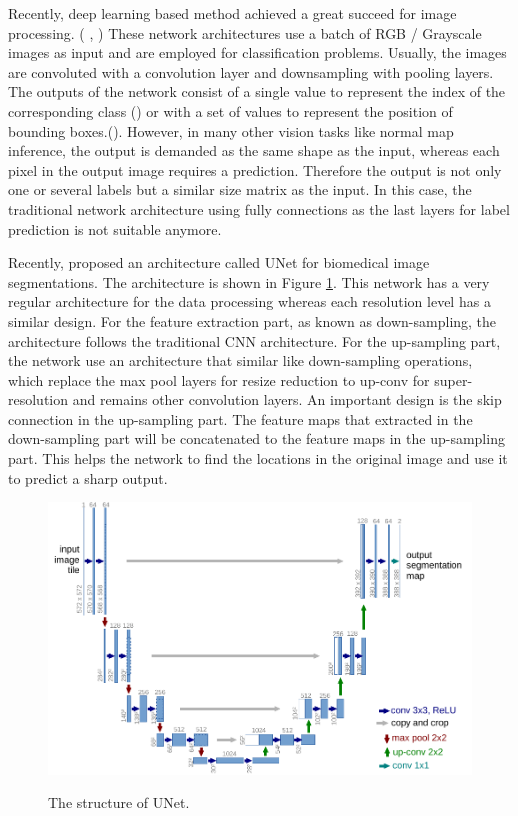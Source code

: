 Recently, deep learning based method achieved a great succeed for image processing. ( \cite{yolov3}, \cite{efficientDet}) These network architectures use a batch of RGB / Grayscale images as input and are employed for classification problems. Usually, the images are convoluted with a convolution layer and downsampling with pooling layers. The outputs of the network consist of a single value to represent the index of the corresponding class (\cite{efficientDet}) or with a set of values to represent the position of bounding boxes.(\cite{yolov3}). However, in many other vision tasks like normal map inference, the output is demanded as the same shape as the input, whereas each pixel in the output image requires a prediction. Therefore the output is not only one or several labels but a similar size matrix as the input. In this case, the traditional network architecture using fully connections as the last layers for label prediction is not suitable anymore.

Recently,\cite{unet} proposed an architecture called UNet for biomedical image segmentations. The architecture is shown in Figure \ref{fig:u-net}. This network has a very regular architecture for the data processing whereas each resolution level has a similar design. For the feature extraction part, as known as down-sampling, the architecture follows the traditional CNN architecture. For the up-sampling part, the network use an architecture that similar like down-sampling operations, which replace the max pool layers for resize reduction to up-conv for super-resolution and remains other convolution layers. An important design is the skip connection in the up-sampling part. The feature maps that extracted in the down-sampling part will be concatenated to the feature maps in the up-sampling part. This helps the network to find the locations in the original image and use it to predict a sharp output.

\begin{figure}[th]
	\centering
	\includegraphics[width=.8\textwidth]{./Figures/u-net-illustration-correct-scale2.pdf}
	\decoRule
	\label{fig:u-net}
	\caption{The structure of UNet. \cite{unet}}
\end{figure}


